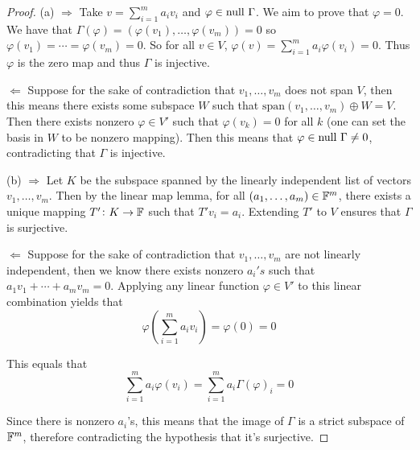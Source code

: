 \documentclass{extarticle}
\begin{document}
\begin{proof}
(a) \(\Rightarrow\) Take \(v = \sum_{i=1}^{m} a_i v_i\) and \(\varphi \in \text{null } \Gamma\). We 
aim to prove that \(\varphi = 0\). We have that \(\Gamma(\varphi) 
= (\varphi(v_1), \ldots, \varphi(v_m)) = 0\) so \(\varphi(v_1) = \cdots = \varphi(v_m) = 0\). 
So for all \(v \in V\), \(\varphi(v) = \sum_{i=1}^{m} a_i \varphi(v_i) = 0\). Thus \(\varphi\)
is the zero map and thus \(\Gamma\) is injective. 

\(\Leftarrow\) Suppose for the sake of contradiction that \(v_1, \ldots, v_m\) does not 
span \(V\), then this means there exists some subspace \(W\) such that \(\text{span}(v_1, \ldots, v_m)
\oplus W = V\). Then there exists nonzero \(\varphi \in V'\) such that \(\varphi(v_k) = 0\) for all  
\(k\) (one can set the basis in \(W\) to be nonzero mapping). Then this means that \(\varphi \in 
\text{null } \Gamma \neq 0\), contradicting that \(\Gamma\) is injective.  


(b) \(\Rightarrow\)  Let \(K\) be the subspace spanned by the linearly independent list of vectors 
\(v_1, \ldots, v_m\). Then by the linear map lemma, for all \((a_1, \ldots, a_m) \in \mathbb{F}^m\), there 
exists a unique mapping \(T' \colon K \to \mathbb{F}\) such that \(T' v_i = a_i\). Extending \(T'\) to \(V\)
ensures that \(\Gamma\) is surjective. 

\(\Leftarrow\) Suppose for the sake of contradiction that \(v_1, \ldots, v_m\) are not linearly 
independent, then we know there exists nonzero \(a_i's\) such that \(a_1 v_1 + \cdots + a_m 
v_m = 0\). Applying any linear function \(\varphi \in V'\) to this linear combination yields that 
\[\varphi(\sum_{i=1}^{m}a_iv_i) = \varphi(0) = 0\]

This equals that 
\[\sum_{i=1}^{m}a_i \varphi(v_i) = \sum_{i=1}^{m}a_i \Gamma(\varphi)_i = 0\]

Since there is nonzero \(a_i\)'s, this means that the image of \(\Gamma\) is a strict subspace 
of \(\mathbb{F}^m\), therefore contradicting the hypothesis that it's surjective.

\end{proof}
\end{document}
